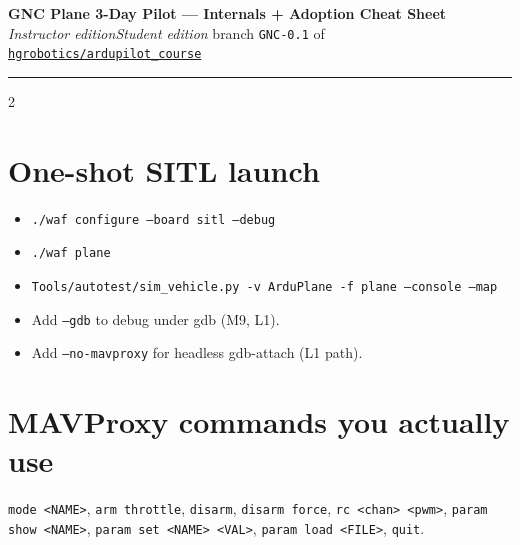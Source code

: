 


\begin{center}
{\Large\bfseries GNC Plane 3-Day Pilot --- Internals + Adoption Cheat Sheet}\\[0.5ex]
\ifinstructor\textit{Instructor edition}\else\textit{Student edition}\fi\quad\textbar\quad
\copyrightline\quad\textbar\quad
branch \texttt{GNC-0.1} of \href{\repourl}{\nolinkurl{hgrobotics/ardupilot_course}}
\end{center}

\hrule
\vspace{0.4ex}

\begin{multicols}{2}

\section*{One-shot SITL launch}
\begin{itemize}\footnotesize
  \item \texttt{./waf configure --board sitl --debug}
  \item \texttt{./waf plane}
  \item \texttt{Tools/autotest/sim\_vehicle.py -v ArduPlane -f plane --console --map}
  \item Add \texttt{--gdb} to debug under gdb (M9, L1).
  \item Add \texttt{--no-mavproxy} for headless gdb-attach (L1 path).
\end{itemize}

\section*{MAVProxy commands you actually use}
\footnotesize
\texttt{mode <NAME>}, \texttt{arm throttle}, \texttt{disarm}, \texttt{disarm force},
\texttt{rc <chan> <pwm>}, \texttt{param show <NAME>}, \texttt{param set <NAME> <VAL>},
\texttt{param load <FILE>}, \texttt{quit}.


\end{multicols}
